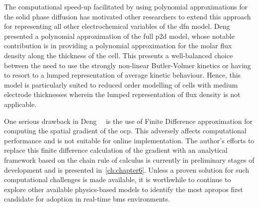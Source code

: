 

The computational  speed-up facilitated  by using polynomial  approximations for
the  solid  phase diffusion  has  motivated  other  researchers to  extend  this
approach for representing  all other electrochemical variables  of the \gls{dfn}
model. Deng~\etal{}~\cite{Deng2018} presented a  polynomial approximation of the
full \gls{p2d}  model, whose notable  contribution is in providing  a polynomial
approximation for  the molar flux  density along the  thickness of the  cell.
This presents a well-balanced choice between the  need to use the strongly
non-linear Butler-Volmer kinetics or having to resort to a lumped representation
of average kinetic behaviour.  Hence, this  model is particularly  suited to
reduced order modelling  of  cells  with  medium  electrode  thicknesses wherein
the  lumped representation of flux density is not applicable.



One  serious  drawback in  Deng~\etal{}~\cite{Deng2018}  is  the use  of  Finite
Difference approximation  for computing the  spatial gradient of  the \gls{ocp}.
This  adversely  affects  computational  performance and  is  not  suitable  for
online implementation.  The author's efforts  to replace this  finite difference
calculation of  the gradient  with an  analytical framework  based on  the chain
rule  of calculus  is  currently in  preliminary stages  of  development and  is
presented in~\cref{ch:chapter6}. Unless a proven solution for such computational
challenges is  made available,  it is  worthwhile to  continue to  explore other
available physics-based models to identify  the most apropos first candidate for
adoption in real-time \gls{bms} environments.


